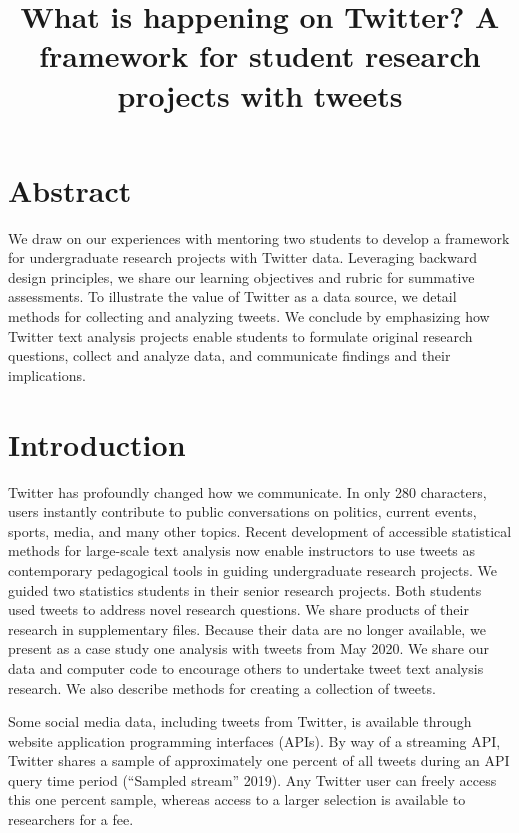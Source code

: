 \documentclass[
]{article}
\title{What is happening on Twitter? A framework for student research projects with tweets}
\author{}
\date{\vspace{-2.5em}}
\begin{document}
\maketitle

\hypertarget{abstract}{%
\section{Abstract}\label{abstract}}

We draw on our experiences with mentoring two students to develop a framework for undergraduate research projects with Twitter data.
Leveraging backward design principles, we share our learning objectives and
rubric for summative assessments. To illustrate the value of Twitter as a data source,
we detail methods for collecting and analyzing tweets. We conclude by emphasizing
how Twitter text analysis projects enable students to formulate
original research questions, collect and analyze data, and communicate
findings and their implications.

\hypertarget{introduction}{%
\section{Introduction}\label{introduction}}

Twitter has profoundly changed how we communicate.
In only 280 characters, users instantly contribute to public conversations on politics,
current events, sports, media, and many other topics.
Recent development of accessible statistical methods for large-scale text
analysis now enable instructors to use tweets as contemporary pedagogical
tools in guiding undergraduate research projects.
We guided two statistics students in their senior research projects.
Both students used tweets to address novel research questions. We
share products of their research in supplementary files. Because
their data are no longer available, we present as a case study one
analysis with tweets from May 2020. We share our data and computer
code to encourage others to undertake
tweet text analysis research. We also describe methods for creating a
collection of tweets.

Some social media data, including tweets from Twitter, is
available through website application programming interfaces (APIs).
By way of a streaming API, Twitter shares a sample of approximately
one percent of all
tweets during an API query time period (``Sampled stream'' 2019). Any Twitter
user can freely
access this one percent sample, whereas access to a larger selection is available to
researchers for a fee.
\end{document}
